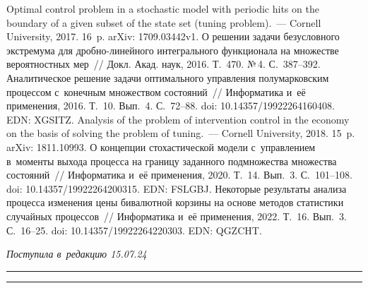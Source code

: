 \begin{multicols}{2}
{\small\frenchspacing
 { %
 \begin{thebibliography}{9}
 Optimal control problem in a stochastic 
model with periodic hits on the boundary of a given subset of the state set 
(tuning problem).~--- Cornell University, 2017.  16~p. arXiv: 1709.03442v1.
 О решении задачи безусловного экстремума 
для дроб\-но-ли\-ней\-но\-го интегрального функционала на множестве вероятностных мер~// 
Докл. Акад. наук, 2016. Т.~470. №\,4. С.~387--392.
Аналитическое решение задачи оптимального управ\-ле\-ния полумарковским процессом 
с~конечным множеством состояний~// Информатика и~её применения, 
2016. Т.~10. Вып.~4. С.~72--88. doi: 10.14357/19922264160408. EDN: XGSITZ.
 Analysis of the problem 
of intervention control in the economy on the basis of solving the problem of 
tuning.~--- Cornell University, 2018.  15~p. arXiv: 1811.10993.
 О концепции 
стохастической модели с~управ\-ле\-ни\-ем в~моменты выхода процесса на границу 
заданного подмножества множества со\-сто\-яний~// Информатика и~её 
применения, 2020. Т.~14. Вып.~3. С.~101--108. doi: 10.14357/19922264200315. EDN: FSLGBJ.
  Некоторые результаты 
анализа процесса изменения цены бивалютной корзины на основе методов статистики 
случайных процессов~// Информатика и~её применения, 2022. Т.~16. 
Вып.~3. С.~16--25. doi: 10.14357/19922264220303. EDN: QGZCHT.
\end{thebibliography}

 }
 }

\end{multicols}

\vspace*{-6pt}

\hfill{\small\textit{Поступила в~редакцию 15.07.24}}

\vspace*{6pt}




\hrule

\vspace*{2pt}

\hrule

